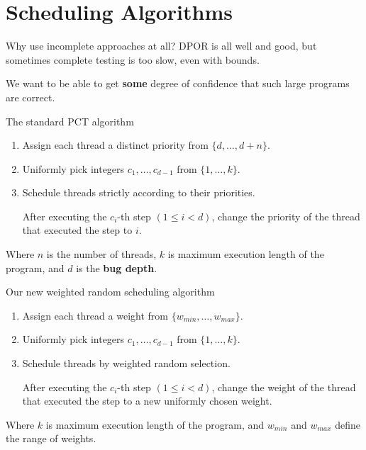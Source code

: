 \documentclass{beamer}
\begin{document}
\section{Scheduling Algorithms}

\begin{frame}{Why use incomplete approaches at all?}
  DPOR is all well and good, but sometimes complete testing is too
  slow, even with bounds.

  We want to be able to get \textbf{some} degree of confidence that
  such large programs are correct.
\end{frame}

\begin{frame}{The standard PCT algorithm}
  \begin{enumerate}
  \item Assign each thread a distinct priority from
    $\{d, \ldots, d+n\}$.
  \item Uniformly pick integers $c_1, \ldots, c_{d-1}$ from
    $\{1, \ldots, k\}$.
  \item Schedule threads strictly according to their priorities.

    After executing the $c_i$-th step $(1 \leq i < d)$, change the
    priority of the thread that executed the step to $i$.
  \end{enumerate}

  Where $n$ is the number of threads, $k$ is maximum execution length
  of the program, and $d$ is the \textbf{bug depth}.
\end{frame}

\begin{frame}{Our new weighted random scheduling algorithm}
  \begin{enumerate}
  \item Assign each thread a weight from
    $\{w_{min}, \ldots, w_{max}\}$.
  \item Uniformly pick integers $c_1, \ldots, c_{d-1}$ from
    $\{1, \ldots, k\}$.
  \item Schedule threads by weighted random selection.

    After executing the $c_i$-th step $(1 \leq i < d)$, change the
    weight of the thread that executed the step to a new uniformly
    chosen weight.
  \end{enumerate}

  Where $k$ is maximum execution length of the program, and $w_{min}$
  and $w_{max}$ define the range of weights.
\end{frame}
\end{document}

